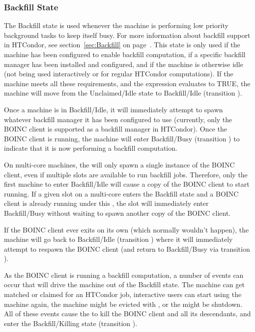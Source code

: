 \subsubsection{\label{sec:Backfill-State}Backfill State}

The Backfill state is used whenever the machine is performing low
priority background tasks to keep itself busy.
For more information about backfill support in HTCondor, see
section~\ref{sec:Backfill} on page~\pageref{sec:Backfill}.
This state is only used if the machine has been configured to enable
backfill computation, if a specific backfill manager has been
installed and configured, and if the machine is otherwise idle (not
being used interactively or for regular HTCondor computations).
If the machine meets all these requirements, and the
 expression evaluates to TRUE, the machine will
move from the Unclaimed/Idle state to Backfill/Idle (transition
).

Once a machine is in Backfill/Idle, it will immediately attempt to
spawn whatever backfill manager it has been configured to use
(currently, only the BOINC client is supported as a backfill manager
in HTCondor).
Once the BOINC client is running, the machine will enter
Backfill/Busy (transition ) to indicate that it is now
performing a backfill computation.

\Note On multi-core machines, the  will only spawn a single
instance of the BOINC client, even if multiple slots are
available to run backfill jobs.
Therefore, only the first machine to enter Backfill/Idle will cause a
copy of the BOINC client to start running.
If a given slot on a multi-core enters the Backfill state and a
BOINC client is already running under this , the
slot will immediately enter Backfill/Busy without waiting
to spawn another copy of the BOINC client.

If the BOINC client ever exits on its own (which normally wouldn't
happen), the machine will go back to Backfill/Idle (transition
) where it will immediately attempt to respawn the BOINC
client (and return to Backfill/Busy via transition ).

As the BOINC client is running a backfill computation, a number of
events can occur that will drive the machine out of the Backfill
state.
The machine can get matched or claimed for an HTCondor job, interactive
users can start using the machine again, the machine might be evicted
with , or the  might be shutdown.
All of these events cause the  to kill the BOINC client
and all its descendants, and enter the Backfill/Killing state
(transition ).

